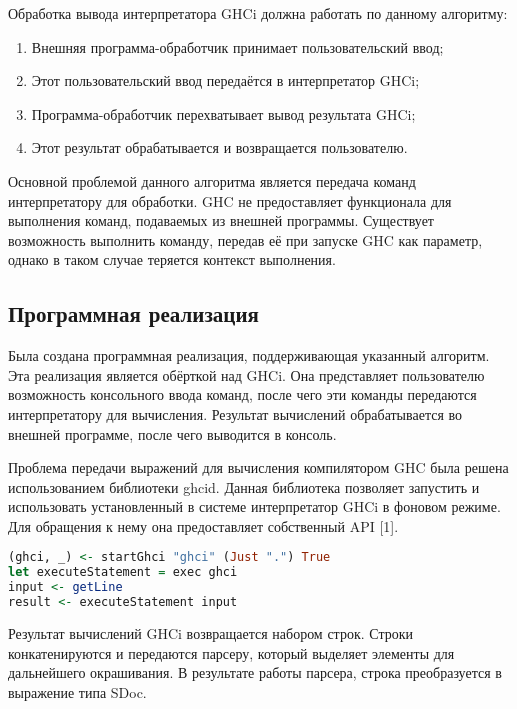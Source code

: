Обработка вывода интерпретатора GHCi должна работать по данному алгоритму:
\begin{enumerate}
  \item Внешняя программа-обработчик принимает пользовательский ввод;
  \item Этот пользовательский ввод передаётся в интерпретатор GHCi;
  \item Программа-обработчик перехватывает вывод результата GHCi;
  \item Этот результат обрабатывается и возвращается пользователю.
\end{enumerate}

Основной проблемой данного алгоритма является передача команд интерпретатору для обработки. GHC не предоставляет функционала для выполнения команд, подаваемых из внешней программы. Существует возможность выполнить команду, передав её при запуске GHC как параметр, однако в таком случае теряется контекст выполнения.

\subsection{Программная реализация}
Была создана программная реализация, поддерживающая указанный алгоритм. Эта реализация является обёрткой над GHCi. Она представляет пользователю возможность консольного ввода команд, после чего эти команды передаются интерпретатору для вычисления. Результат вычислений обрабатывается во внешней программе, после чего выводится в консоль.

Проблема передачи выражений для вычисления компилятором GHC была решена использованием библиотеки ghcid. Данная библиотека позволяет запустить и использовать установленный в системе интерпретатор GHCi в фоновом режиме. Для обращения к нему она предоставляет собственный API [1].

\begin{lstlisting}[language=Haskell, caption=Пример выполнения входной строки с помощью ghcid]
(ghci, _) <- startGhci "ghci" (Just ".") True
let executeStatement = exec ghci
input <- getLine
result <- executeStatement input
\end{lstlisting}

Результат вычислений GHCi возвращается набором строк. Строки конкатенируются и передаются парсеру, который выделяет элементы для дальнейшего окрашивания. В результате работы парсера, строка преобразуется в выражение типа SDoc.

